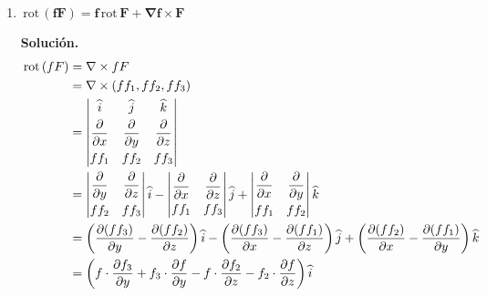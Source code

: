 \documentclass[fleqn, 12pt]{article}
\newcommand{\derivadaparcial}[2]{\dfrac{\partial {#1}}{\partial {#2}}}
\newcommand{\rot}{\mathrm{\, rot \,}}
\begin{document}
\begin{enumerate}
        \item $ \mathbf{\rot (f F) = f \rot F + \nabla f \times F} $
        
        \textbf{Solución.}
        \begin{align*}
            \rot (f F) &= \nabla \times f F \\
            &= \nabla \times (ff_1, ff_2, ff_3) \\
            &= \left\rvert 
            \begin{matrix}
                \widehat{i} & \widehat{j} & \widehat{k} \vspace{1mm} \\
                \derivadaparcial{}{x} & \derivadaparcial{}{y} & \derivadaparcial{}{z} \vspace{1mm} \\
                ff_1 & ff_2 & ff_3
            \end{matrix}
            \right\rvert \\
            &= \left\rvert 
            \begin{matrix}
                \derivadaparcial{}{y} & \derivadaparcial{}{z} \vspace{1mm} \\
                ff_2 & ff_3
            \end{matrix}
            \right\rvert \widehat{i} -
            \left\rvert 
            \begin{matrix}
                \derivadaparcial{}{x} & \derivadaparcial{}{z} \vspace{1mm} \\
                ff_1 & ff_3
            \end{matrix}
            \right\rvert \widehat{j} +
            \left\rvert 
            \begin{matrix}
                \derivadaparcial{}{x} & \derivadaparcial{}{y} \vspace{1mm} \\
                ff_1 & ff_2
            \end{matrix}
            \right\rvert \widehat{k} \\
            &= \left( \derivadaparcial{(ff_3)}{y} - \derivadaparcial{(ff_2)}{z} \right) \widehat{i} - \left( \derivadaparcial{(ff_3)}{x} - \derivadaparcial{(ff_1)}{z} \right) \widehat{j} + \left( \derivadaparcial{(ff_2)}{x} - \derivadaparcial{(ff_1)}{y} \right) \widehat{k} \\
            &= \left( f \cdot \derivadaparcial{f_3}{y} + f_3 \cdot \derivadaparcial{f}{y} - f \cdot \derivadaparcial{f_2}{z} - f_2 \cdot \derivadaparcial{f}{z} \right) \widehat{i} \\ 

\end{align*}
\end{enumerate}
\end{document}
